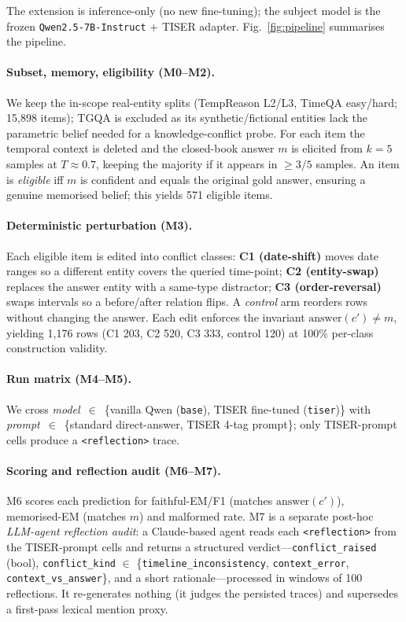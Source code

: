 \documentclass[conference]{IEEEtran}
\begin{document}
The extension is inference-only (no new fine-tuning); the subject model is the frozen \texttt{Qwen2.5-7B-Instruct} + TISER adapter. Fig.~\ref{fig:pipeline} summarises the pipeline.

\paragraph{Subset, memory, eligibility (M0--M2).}
We keep the in-scope real-entity splits (TempReason L2/L3, TimeQA easy/hard; 15,898 items); TGQA is excluded as its synthetic/fictional entities lack the parametric belief needed for a knowledge-conflict probe. For each item the temporal context is deleted and the closed-book answer $m$ is elicited from $k{=}5$ samples at $T{\approx}0.7$, keeping the majority if it appears in ${\geq}3/5$ samples. An item is \emph{eligible} iff $m$ is confident and equals the original gold answer, ensuring a genuine memorised belief; this yields 571 eligible items.

\paragraph{Deterministic perturbation (M3).}
Each eligible item is edited into conflict classes:
\textbf{C1 (date-shift)} moves date ranges so a different entity covers the queried time-point;
\textbf{C2 (entity-swap)} replaces the answer entity with a same-type distractor;
\textbf{C3 (order-reversal)} swaps intervals so a before/after relation flips.
A \emph{control} arm reorders rows without changing the answer. Each edit enforces the invariant $\text{answer}(c'){\neq}m$, yielding 1,176 rows (C1 203, C2 520, C3 333, control 120) at 100\% per-class construction validity.

\paragraph{Run matrix (M4--M5).}
We cross \emph{model}~$\in$~\{vanilla Qwen (\texttt{base}), TISER fine-tuned (\texttt{tiser})\} with \emph{prompt}~$\in$~\{standard direct-answer, TISER 4-tag prompt\}; only TISER-prompt cells produce a \texttt{<reflection>} trace.

\paragraph{Scoring and reflection audit (M6--M7).}
M6 scores each prediction for faithful-EM/F1 (matches $\text{answer}(c')$), memorised-EM (matches $m$) and malformed rate. M7 is a separate post-hoc \emph{LLM-agent reflection audit}: a Claude-based agent reads each \texttt{<reflection>} from the TISER-prompt cells and returns a structured verdict---\texttt{conflict\_raised} (bool), \texttt{conflict\_kind} $\in$ \{\texttt{timeline\_inconsistency}, \texttt{context\_error}, \texttt{context\_vs\_answer}\}, and a short rationale---processed in windows of 100 reflections. It re-generates nothing (it judges the persisted traces) and supersedes a first-pass lexical mention proxy.
\end{document}
